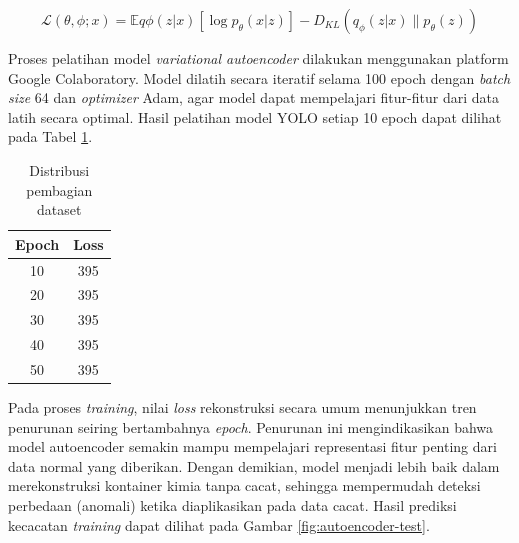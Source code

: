 \begin{equation}
  \mathcal{L}(\theta, \phi; x) = \mathbb{E}{q\phi(z|x)}[\log
  p_\theta(x|z)] - D_{KL}(q_\phi(z|x) \parallel p_\theta(z))
\end{equation}

Proses pelatihan model \textit{variational autoencoder} dilakukan
menggunakan platform Google
Colaboratory. Model dilatih secara iteratif selama 100 epoch dengan
\textit{batch size} 64
dan \textit{optimizer} Adam, agar model dapat mempelajari fitur-fitur dari
data latih secara
optimal. Hasil pelatihan model YOLO setiap 10 epoch dapat dilihat
pada Tabel \ref{tab:training-autoencoder}.

\begin{table}[H]
  \caption{Distribusi pembagian dataset}
  \label{tab:training-autoencoder}
  \vspace{-1em}
  \centering
  \begin{tabular}{cc}
    \toprule
    \textbf{Epoch} & \textbf{Loss} \\
    \midrule
    10 & 395 \\
    20 & 395 \\
    30 & 395 \\
    40 & 395 \\
    50 & 395 \\
    \bottomrule
  \end{tabular}
\end{table}

Pada proses \textit{training}, nilai \textit{loss} rekonstruksi
secara umum menunjukkan tren penurunan seiring bertambahnya
\textit{epoch}. Penurunan ini mengindikasikan bahwa model autoencoder
semakin mampu mempelajari representasi fitur penting dari data normal
yang diberikan. Dengan demikian, model menjadi lebih baik dalam
merekonstruksi kontainer kimia tanpa cacat, sehingga mempermudah
deteksi perbedaan (anomali) ketika diaplikasikan pada data cacat.
Hasil prediksi kecacatan \textit{training} dapat dilihat
pada Gambar \ref{fig:autoencoder-test}.

